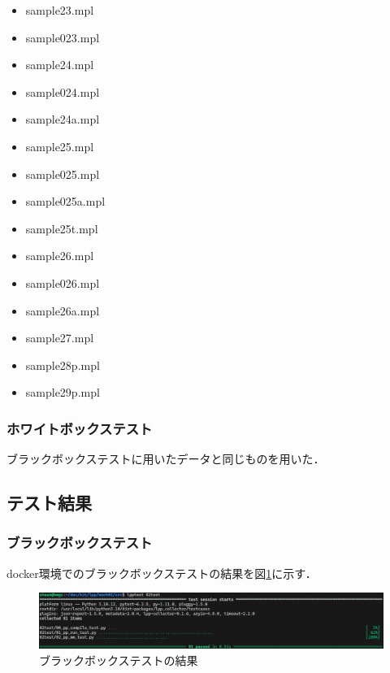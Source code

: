 \documentclass{jlreq}
\begin{document}
\begin{itemize}
  \item sample23.mpl
  \item sample023.mpl
  \item sample24.mpl
  \item sample024.mpl
  \item sample24a.mpl
  \item sample25.mpl
  \item sample025.mpl
  \item sample025a.mpl
  \item sample25t.mpl
  \item sample26.mpl
  \item sample026.mpl
  \item sample26a.mpl
  \item sample27.mpl
  \item sample28p.mpl
  \item sample29p.mpl
\end{itemize}

\subsubsection{ホワイトボックステスト}
ブラックボックステストに用いたデータと同じものを用いた．

\subsection{テスト結果}
\subsubsection{ブラックボックステスト}
docker環境でのブラックボックステストの結果を図\ref{fig:black_box_test}に示す．
\begin{figure}[H]
  \centering
  \includegraphics[width=\textwidth]{assets/black_box_test.png}
  \caption{ブラックボックステストの結果}
  \label{fig:black_box_test}
\end{figure}
\end{document}
